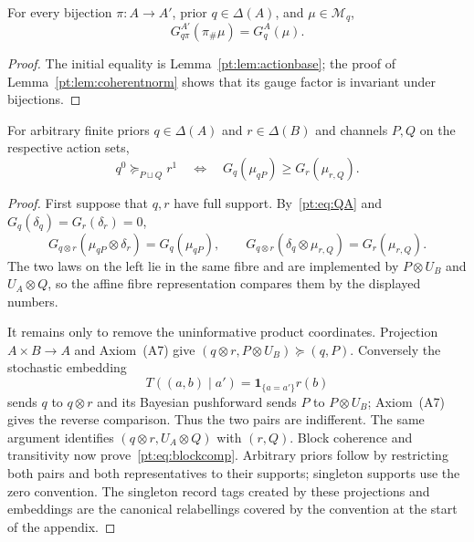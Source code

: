 \begin{corollary}
\label{pt:cor:permutationinvariance}
For every bijection $\pi:A\to A'$, prior $q\in\Delta(A)$, and
$\mu\in\mathcal M_q$,
\[
 G_{q\pi}^{A'}(\pi_\#\mu)=G_q^A(\mu).
\]
\end{corollary}

\begin{proof}
The initial equality is Lemma~\ref{pt:lem:actionbase}; the proof of
Lemma~\ref{pt:lem:coherentnorm} shows that its gauge factor is invariant under
bijections.
\end{proof}

\begin{lemma}
\label{pt:lem:blockbridge}
For arbitrary finite priors $q\in\Delta(A)$ and $r\in\Delta(B)$ and channels
$P,Q$ on the respective action sets,
\begin{equation}
 q^0\succeq_{P\sqcup Q}r^1
 \quad\Longleftrightarrow\quad
 G_q(\mu_{qP})\ge G_r(\mu_{r,Q}).
\tag{BC}\label{pt:eq:blockcomp}
\end{equation}
\end{lemma}

\begin{proof}
First suppose that $q,r$ have full support.  By~\eqref{pt:eq:QA} and
$G_q(\delta_q)=G_r(\delta_r)=0$,
\[
 G_{q\otimes r}(\mu_{qP}\otimes\delta_r)=G_q(\mu_{qP}),
 \qquad
 G_{q\otimes r}(\delta_q\otimes\mu_{r,Q})=G_r(\mu_{r,Q}).
\]
The two laws on the left lie in the same fibre and are implemented by
$P\otimes U_B$ and $U_A\otimes Q$, so the affine fibre representation
compares them by the displayed numbers.

It remains only to remove the uninformative product coordinates.  Projection
$A\times B\to A$ and Axiom~\textup{(A7)} give
$(q\otimes r,P\otimes U_B)\succeq(q,P)$.  Conversely the stochastic
embedding
\[
 T((a,b)\mid a')=\mathbf 1_{\{a=a'\}}r(b)
\]
sends $q$ to $q\otimes r$ and its Bayesian pushforward sends $P$ to
$P\otimes U_B$; Axiom~\textup{(A7)} gives the reverse comparison.  Thus the
two pairs are indifferent.  The same argument identifies
$(q\otimes r,U_A\otimes Q)$ with $(r,Q)$.  Block coherence and transitivity
now prove~\eqref{pt:eq:blockcomp}.  Arbitrary priors follow by restricting
both pairs and both representatives to their supports; singleton supports use
the zero convention.  The singleton record tags created by these projections
and embeddings are the canonical relabellings covered by the convention at
the start of the appendix.
\end{proof}


